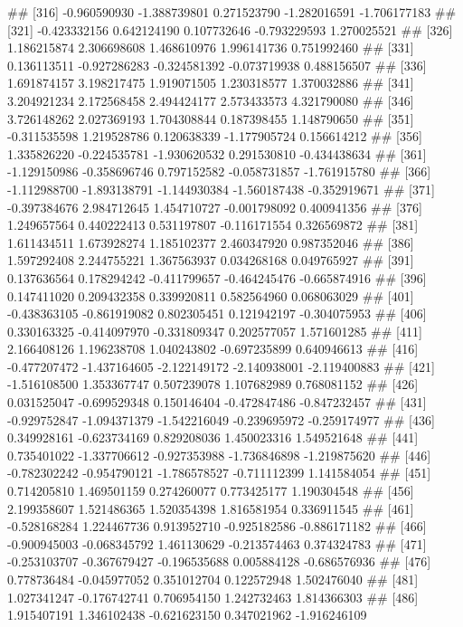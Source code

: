 \documentclass[
]{article}
\begin{document}
\begin{enumerate}[label=(\alph*)]
##  [316] -0.960590930 -1.388739801  0.271523790 -1.282016591 -1.706177183
##  [321] -0.423332156  0.642124190  0.107732646 -0.793229593  1.270025521
##  [326]  1.186215874  2.306698608  1.468610976  1.996141736  0.751992460
##  [331]  0.136113511 -0.927286283 -0.324581392 -0.073719938  0.488156507
##  [336]  1.691874157  3.198217475  1.919071505  1.230318577  1.370032886
##  [341]  3.204921234  2.172568458  2.494424177  2.573433573  4.321790080
##  [346]  3.726148262  2.027369193  1.704308844  0.187398455  1.148790650
##  [351] -0.311535598  1.219528786  0.120638339 -1.177905724  0.156614212
##  [356]  1.335826220 -0.224535781 -1.930620532  0.291530810 -0.434438634
##  [361] -1.129150986 -0.358696746  0.797152582 -0.058731857 -1.761915780
##  [366] -1.112988700 -1.893138791 -1.144930384 -1.560187438 -0.352919671
##  [371] -0.397384676  2.984712645  1.454710727 -0.001798092  0.400941356
##  [376]  1.249657564  0.440222413  0.531197807 -0.116171554  0.326569872
##  [381]  1.611434511  1.673928274  1.185102377  2.460347920  0.987352046
##  [386]  1.597292408  2.244755221  1.367563937  0.034268168  0.049765927
##  [391]  0.137636564  0.178294242 -0.411799657 -0.464245476 -0.665874916
##  [396]  0.147411020  0.209432358  0.339920811  0.582564960  0.068063029
##  [401] -0.438363105 -0.861919082  0.802305451  0.121942197 -0.304075953
##  [406]  0.330163325 -0.414097970 -0.331809347  0.202577057  1.571601285
##  [411]  2.166408126  1.196238708  1.040243802 -0.697235899  0.640946613
##  [416] -0.477207472 -1.437164605 -2.122149172 -2.140938001 -2.119400883
##  [421] -1.516108500  1.353367747  0.507239078  1.107682989  0.768081152
##  [426]  0.031525047 -0.699529348  0.150146404 -0.472847486 -0.847232457
##  [431] -0.929752847 -1.094371379 -1.542216049 -0.239695972 -0.259174977
##  [436]  0.349928161 -0.623734169  0.829208036  1.450023316  1.549521648
##  [441]  0.735401022 -1.337706612 -0.927353988 -1.736846898 -1.219875620
##  [446] -0.782302242 -0.954790121 -1.786578527 -0.711112399  1.141584054
##  [451]  0.714205810  1.469501159  0.274260077  0.773425177  1.190304548
##  [456]  2.199358607  1.521486365  1.520354398  1.816581954  0.336911545
##  [461] -0.528168284  1.224467736  0.913952710 -0.925182586 -0.886171182
##  [466] -0.900945003 -0.068345792  1.461130629 -0.213574463  0.374324783
##  [471] -0.253103707 -0.367679427 -0.196535688  0.005884128 -0.686576936
##  [476]  0.778736484 -0.045977052  0.351012704  0.122572948  1.502476040
##  [481]  1.027341247 -0.176742741  0.706954150  1.242732463  1.814366303
##  [486]  1.915407191  1.346102438 -0.621623150  0.347021962 -1.916246109

\end{enumerate}
\end{document}
